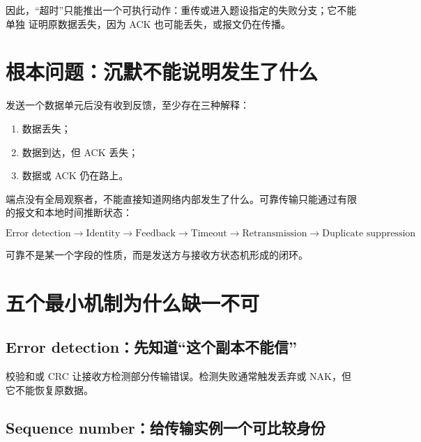 \documentclass[UTF8,fontset=none,11pt,a4paper]{ctexart}
\providecommand{\tightlist}{\setlength{\itemsep}{0pt}\setlength{\parskip}{0pt}}
\begin{document}
因此，“超时”只能推出一个可执行动作：重传或进入题设指定的失败分支；它不能单独
证明原数据丢失，因为 ACK 也可能丢失，或报文仍在传播。

\section{根本问题：沉默不能说明发生了什么}\label{1-ux6839ux672cux95eeux9898ux6c89ux9ed8ux4e0dux80fdux8bf4ux660eux53d1ux751fux4e86ux4ec0ux4e48}

发送一个数据单元后没有收到反馈，至少存在三种解释：

\begin{enumerate}
\def\labelenumi{\arabic{enumi}.}
\tightlist
\item
  数据丢失；
\item
  数据到达，但 ACK 丢失；
\item
  数据或 ACK 仍在路上。
\end{enumerate}

端点没有全局观察者，不能直接知道网络内部发生了什么。可靠传输只能通过有限的报文和本地时间推断状态：

\[
\boxed{
\text{Error detection}
\to \text{Identity}
\to \text{Feedback}
\to \text{Timeout}
\to \text{Retransmission}
\to \text{Duplicate suppression}
}
\]

可靠不是某一个字段的性质，而是发送方与接收方状态机形成的闭环。

\section{五个最小机制为什么缺一不可}\label{2-ux4e94ux4e2aux6700ux5c0fux673aux5236ux4e3aux4ec0ux4e48ux7f3aux4e00ux4e0dux53ef}

\subsection{Error
detection：先知道``这个副本不能信''}\label{21-error-detectionux5148ux77e5ux9053ux8fd9ux4e2aux526fux672cux4e0dux80fdux4fe1}

校验和或 CRC 让接收方检测部分传输错误。检测失败通常触发丢弃或
NAK，但它不能恢复原数据。

\subsection{Sequence
number：给传输实例一个可比较身份}\label{22-sequence-numberux7ed9ux4f20ux8f93ux5b9eux4f8bux4e00ux4e2aux53efux6bd4ux8f83ux8eabux4efd}
\end{document}
